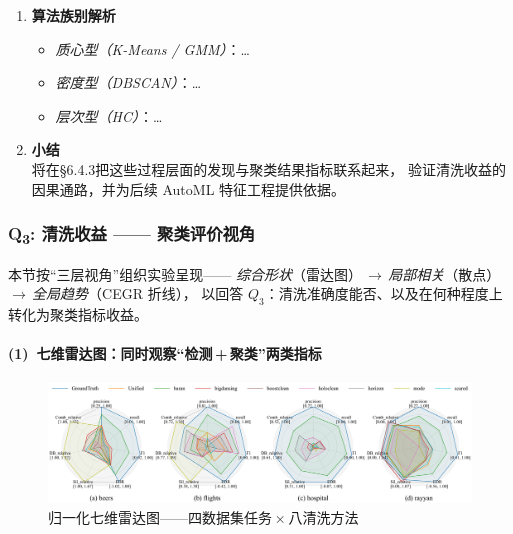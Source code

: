 \documentclass[10pt]{article} %
\numberwithin{equation}{section}
\begin{document}
\begin{enumerate}[label=(\alph*)]
\vspace{0.4em}

\item \textbf{算法族别解析}\\
\begin{itemize}
  \item \emph{质心型（K-Means / GMM）}：\quad \dots
  \item \emph{密度型（DBSCAN）}：\quad \dots
  \item \emph{层次型（HC）}：\quad \dots
\end{itemize}

\item \textbf{小结}\\
将在§6.4.3把这些过程层面的发现与聚类结果指标联系起来，
验证清洗收益的因果通路，并为后续 AutoML 特征工程提供依据。
\end{enumerate}

\subsubsection{Q\textsubscript{3}: 清洗收益 —— 聚类评价视角}
\label{sec:q3-metric}
本节按“三层视角”组织实验呈现——  
\emph{综合形状}（雷达图）\,$\rightarrow$\,\emph{局部相关}（散点）%
\,$\rightarrow$\,\emph{全局趋势}（CEGR 折线），  
以回答 \(Q_3\)：清洗准确度能否、以及在何种程度上转化为聚类指标收益。

\paragraph{(1)~七维雷达图：同时观察“检测\,+\,聚类”两类指标}\par
\begin{figure}[t]
  \centering
  \includegraphics[width=\linewidth]{figures/6.4.3graph/radar_four_in_one.pdf}
  \caption{归一化七维雷达图——四数据集任务 × 八清洗方法}
  \label{fig:radar_four_in_one}
\end{figure}
\end{document}
